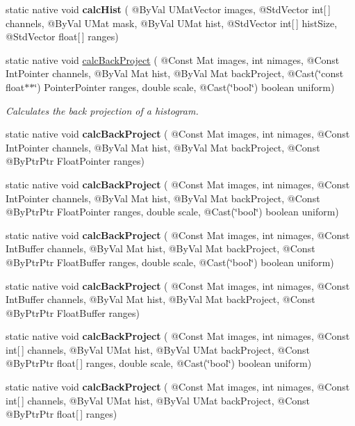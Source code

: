 \begin{DoxyCompactItemize}
\item 
static native void {\bfseries calc\+Hist} ( @By\+Val U\+Mat\+Vector images, @Std\+Vector int\mbox{[}$\,$\mbox{]} channels, @By\+Val U\+Mat mask, @By\+Val U\+Mat hist, @Std\+Vector int\mbox{[}$\,$\mbox{]} hist\+Size, @Std\+Vector float\mbox{[}$\,$\mbox{]} ranges)
\item 
static native void \hyperlink{group__imgproc__hist_gaf0312cafdf92e7baeb662d460281307e}{calc\+Back\+Project} ( @Const Mat images, int nimages, @Const Int\+Pointer channels, @By\+Val Mat hist, @By\+Val Mat back\+Project, @Cast(\char`\"{}const float$\ast$$\ast$\char`\"{}) Pointer\+Pointer ranges, double scale, @Cast(\char`\"{}bool\char`\"{}) boolean uniform)
\begin{DoxyCompactList}\small\item\em Calculates the back projection of a histogram. \end{DoxyCompactList}\item 
static native void {\bfseries calc\+Back\+Project} ( @Const Mat images, int nimages, @Const Int\+Pointer channels, @By\+Val Mat hist, @By\+Val Mat back\+Project, @Const @By\+Ptr\+Ptr Float\+Pointer ranges)
\item 
static native void {\bfseries calc\+Back\+Project} ( @Const Mat images, int nimages, @Const Int\+Pointer channels, @By\+Val Mat hist, @By\+Val Mat back\+Project, @Const @By\+Ptr\+Ptr Float\+Pointer ranges, double scale, @Cast(\char`\"{}bool\char`\"{}) boolean uniform)
\item 
static native void {\bfseries calc\+Back\+Project} ( @Const Mat images, int nimages, @Const Int\+Buffer channels, @By\+Val Mat hist, @By\+Val Mat back\+Project, @Const @By\+Ptr\+Ptr Float\+Buffer ranges, double scale, @Cast(\char`\"{}bool\char`\"{}) boolean uniform)
\item 
static native void {\bfseries calc\+Back\+Project} ( @Const Mat images, int nimages, @Const Int\+Buffer channels, @By\+Val Mat hist, @By\+Val Mat back\+Project, @Const @By\+Ptr\+Ptr Float\+Buffer ranges)
\item 
static native void {\bfseries calc\+Back\+Project} ( @Const Mat images, int nimages, @Const int\mbox{[}$\,$\mbox{]} channels, @By\+Val U\+Mat hist, @By\+Val U\+Mat back\+Project, @Const @By\+Ptr\+Ptr float\mbox{[}$\,$\mbox{]} ranges, double scale, @Cast(\char`\"{}bool\char`\"{}) boolean uniform)
\item 
static native void {\bfseries calc\+Back\+Project} ( @Const Mat images, int nimages, @Const int\mbox{[}$\,$\mbox{]} channels, @By\+Val U\+Mat hist, @By\+Val U\+Mat back\+Project, @Const @By\+Ptr\+Ptr float\mbox{[}$\,$\mbox{]} ranges)
$$
\end{DoxyCompactItemize}
